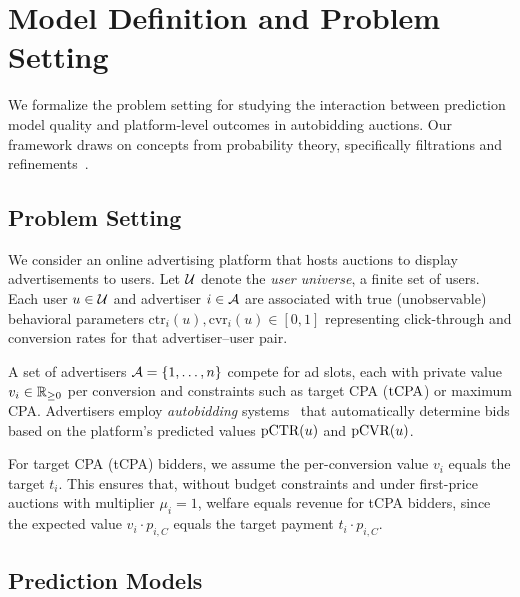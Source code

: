 
\section{Model Definition and Problem Setting}
\label{sec:model}

We formalize the problem setting for studying the interaction between prediction model quality and platform-level outcomes in autobidding auctions. Our framework draws on concepts from probability theory, specifically filtrations and refinements~\citep{hardy1952inequalities,durrett2019probability}.

\subsection{Problem Setting}
\label{subsec:problem_setting}

We consider an online advertising platform that hosts auctions to display advertisements to users. Let $\mathcal{U}$ denote the \emph{user universe}, a finite set of users. Each user $u \in \mathcal{U}$ and advertiser $i \in \mathcal{A}$ are associated with true (unobservable) behavioral parameters $\mathrm{ctr}_i(u), \mathrm{cvr}_i(u) \in [0,1]$ representing click-through and conversion rates for that advertiser--user pair.

A set of advertisers $\mathcal{A} = \{1, \ldots, n\}$ compete for ad slots, each with private value $v_i \in \mathbb{R}_{\geq 0}$ per conversion and constraints such as target CPA ($\text{tCPA}$) or maximum CPA. Advertisers employ \emph{autobidding} systems~\citep{aggarwal2019autobidding,aggarwal2024autobidding} that automatically determine bids based on the platform's predicted values $\text{pCTR}(u)$ and $\text{pCVR}(u)$.

\begin{assumption}
\label{assumption:value_equals_target}
For target CPA (tCPA) bidders, we assume the per-conversion value $v_i$ equals the target $t_i$. This ensures that, without budget constraints and under first-price auctions with multiplier $\mu_i = 1$, welfare equals revenue for tCPA bidders, since the expected value $v_i \cdot p_{i,C}$ equals the target payment $t_i \cdot p_{i,C}$.
\end{assumption}

\subsection{Prediction Models}
\label{subsec:prediction_models}

